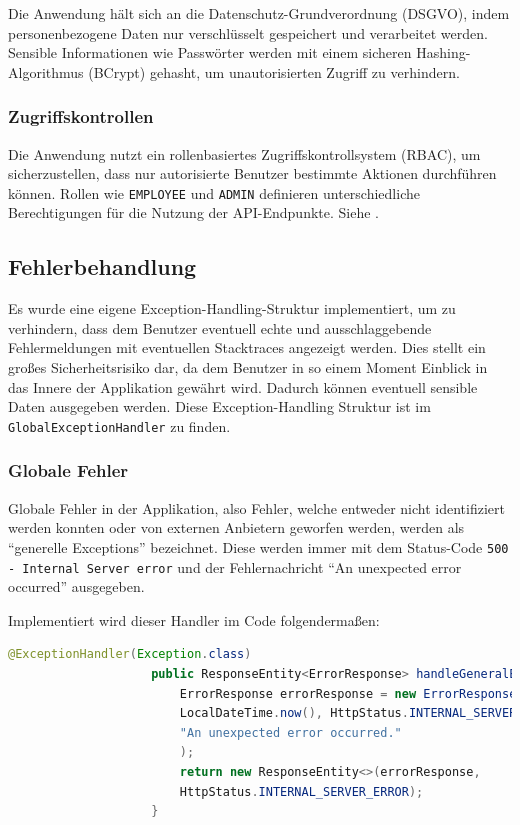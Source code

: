 				Die Anwendung hält sich an die Datenschutz-Grundverordnung (DSGVO), indem personenbezogene Daten nur verschlüsselt gespeichert und verarbeitet werden. Sensible Informationen wie Passwörter werden mit einem sicheren Hashing-Algorithmus (BCrypt) gehasht, um unautorisierten Zugriff zu verhindern.
				
				\subsubsection{Zugriffskontrollen}
				
				Die Anwendung nutzt ein rollenbasiertes Zugriffskontrollsystem (RBAC), um sicherzustellen, dass nur autorisierte Benutzer bestimmte Aktionen durchführen können. Rollen wie \texttt{EMPLOYEE} und \texttt{ADMIN} definieren unterschiedliche Berechtigungen für die Nutzung der API-Endpunkte. Siehe \cite{prompt-gpt-datenschutz-implementation}.
				
				\subsection{Fehlerbehandlung}
				
				Es wurde eine eigene Exception-Handling-Struktur implementiert, um zu verhindern, dass dem Benutzer eventuell echte und ausschlaggebende Fehlermeldungen mit eventuellen Stacktraces angezeigt werden. Dies stellt ein großes Sicherheitsrisiko dar, da dem Benutzer in so einem Moment Einblick in das Innere der Applikation gewährt wird. Dadurch können eventuell sensible Daten ausgegeben werden. Diese Exception-Handling Struktur ist im \texttt{GlobalExceptionHandler} zu finden.
				
				\subsubsection{Globale Fehler}
				
				Globale Fehler in der Applikation, also Fehler, welche entweder nicht identifiziert werden konnten oder von externen Anbietern geworfen werden, werden als \enquote{generelle Exceptions} bezeichnet. Diese werden immer mit dem Status-Code \texttt{500 - Internal Server error} und der Fehlernachricht \enquote{An unexpected error occurred} ausgegeben. 
				
				Implementiert wird dieser Handler im Code folgendermaßen:
				
				\begin{lstlisting}[caption={Der Globale Fehler-Handler.}, label={code-global-exc-handler}, language=Java]
					@ExceptionHandler(Exception.class)
					public ResponseEntity<ErrorResponse> handleGeneralException(Exception ex) {
						ErrorResponse errorResponse = new ErrorResponse(
						LocalDateTime.now(), HttpStatus.INTERNAL_SERVER_ERROR.value(),
						"An unexpected error occurred."
						);
						return new ResponseEntity<>(errorResponse,
						HttpStatus.INTERNAL_SERVER_ERROR);
					}
				\end{lstlisting}
				
